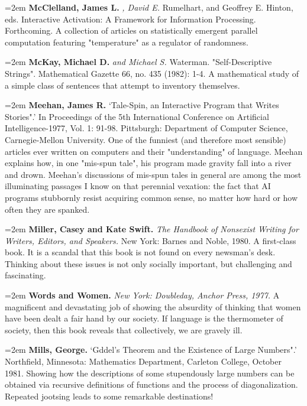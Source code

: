 \par\noindent\hangindent=2em {\bf McClelland, James L.} {\it , David E.} Rumelhart, and Geoffrey E. Hinton, eds. Interactive Activation: A Framework for Information Processing. Forthcoming. A collection of articles on statistically emergent parallel computation featuring "temperature" as a regulator of randomness.

\par\noindent\hangindent=2em {\bf McKay, Michael D.} {\it and Michael S.} Waterman. "Self-Descriptive Strings". Mathematical Gazette 66, no. 435 (1982): 1-4. A mathematical study of a simple class of sentences that attempt to inventory themselves.

\par\noindent\hangindent=2em {\bf Meehan, James R.} `Tale-Spin, an Interactive Program that Writes Stories".' In Proceedings of the 5th International Conference on Artificial Intelligence-1977, Vol. 1: 91-98. Pittsburgh: Department of Computer Science, Carnegie-Mellon University. One of the funniest (and therefore most sensible) articles ever written on computers and their "understanding" of language. Meehan explains how, in one "mis-spun tale", his program made gravity fall into a river and drown. Meehan's discussions of mis-spun tales in general are among the most illuminating passages I know on that perennial vexation: the fact that AI programs stubbornly resist acquiring common sense, no matter how hard or how often they are spanked.

\par\noindent\hangindent=2em {\bf Miller, Casey and Kate Swift.} {\it The Handbook of Nonsexist Writing for Writers, Editors, and Speakers.} New York: Barnes and Noble, 1980. A first-class book. It is a scandal that this book is not found on every newsman's desk. Thinking about these issues is not only socially important, but challenging and fascinating.

\par\noindent\hangindent=2em {\bf Words and Women.} {\it New York: Doubleday, Anchor Press, 1977.} A magnificent and devastating job of showing the absurdity of thinking that women have been dealt a fair hand by our society. If language is the thermometer of society, then this book reveals that collectively, we are gravely ill.

\par\noindent\hangindent=2em {\bf Mills, George.} `Gddel's Theorem and the Existence of Large Numbers".' Northfield, Minnesota: Mathematics Department, Carleton College, October 1981. Showing how the descriptions of some stupendously large numbers can be obtained via recursive definitions of functions and the process of diagonalization. Repeated jootsing leads to some remarkable destinations!

